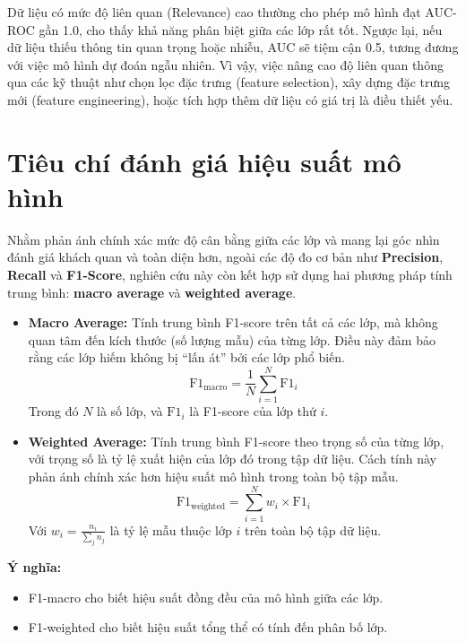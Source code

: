 Dữ liệu có mức độ liên quan (Relevance) cao thường cho phép mô hình đạt AUC-ROC gần 1.0, cho thấy khả năng phân biệt giữa các lớp rất tốt. Ngược lại, nếu dữ liệu thiếu thông tin quan trọng hoặc nhiễu, AUC sẽ tiệm cận 0.5, tương đương với việc mô hình dự đoán ngẫu nhiên. Vì vậy, việc nâng cao độ liên quan thông qua các kỹ thuật như chọn lọc đặc trưng (feature selection), xây dựng đặc trưng mới (feature engineering), hoặc tích hợp thêm dữ liệu có giá trị là điều thiết yếu. 

\section{Tiêu chí đánh giá hiệu suất mô hình}
 Nhằm phản ánh chính xác mức độ cân bằng giữa các lớp và mang lại góc nhìn đánh giá khách quan và toàn diện hơn, ngoài các độ đo cơ bản như \textbf{Precision}, \textbf{Recall} và \textbf{F1-Score}, nghiên cứu này còn kết hợp sử dụng hai phương pháp tính trung bình: \textbf{macro average} và \textbf{weighted average}.

\begin{itemize}
    \item \textbf{Macro Average:} Tính trung bình F1-score trên tất cả các lớp, mà không quan tâm đến kích thước (số lượng mẫu) của từng lớp. Điều này đảm bảo rằng các lớp hiếm không bị “lấn át” bởi các lớp phổ biến.
    \begin{equation}
        \text{F1}_{\text{macro}} = \frac{1}{N} \sum_{i=1}^{N} \text{F1}_i
    \end{equation}
    Trong đó $N$ là số lớp, và $\text{F1}_i$ là F1-score của lớp thứ $i$.

    \item \textbf{Weighted Average:} Tính trung bình F1-score theo trọng số của từng lớp, với trọng số là tỷ lệ xuất hiện của lớp đó trong tập dữ liệu. Cách tính này phản ánh chính xác hơn hiệu suất mô hình trong toàn bộ tập mẫu.
    \begin{equation}
        \text{F1}_{\text{weighted}} = \sum_{i=1}^{N} w_i \times \text{F1}_i
    \end{equation}
    Với $w_i = \frac{n_i}{\sum_j n_j}$ là tỷ lệ mẫu thuộc lớp $i$ trên toàn bộ tập dữ liệu.
\end{itemize}

\textbf{Ý nghĩa:} 
\begin{itemize}
    \item F1-macro cho biết hiệu suất đồng đều của mô hình giữa các lớp.
    \item F1-weighted cho biết hiệu suất tổng thể có tính đến phân bố lớp.
\end{itemize}

